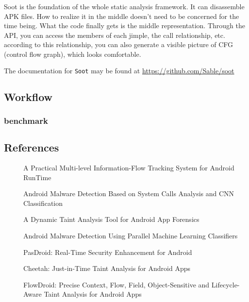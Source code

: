\documentclass{article}
\begin{document}
Soot is the foundation of the whole static analysis framework. It can disassemble APK files. How to realize it in the middle doesn't need to be concerned for the time being. What the code finally gets is the middle representation. Through the API, you can access the members of each jimple, the call relationship, etc. according to this relationship, you can also generate a visible picture of CFG (control flow graph), which looks comfortable.

The documentation for \verb+Soot+ may be found at  \url{https://github.com/Sable/soot}

\subsection{Workflow}
\lipsum[5]
\subsubsection{benchmark}
\lipsum[5]


%   


\subsection{References}
  \begin{description}
    \item[\cite{Sun2016CCS}] A Practical Multi-level Information-Flow Tracking System for Android RunTime
    \item[\cite{ABDE2019WCNCW}] Android Malware Detection Based on System Calls Analysis and CNN Classification
    \item[\cite{Xu2018SPW}] A Dynamic Taint Analysis Tool for Android App Forensics
    \item[\cite{Yerima2014NGMAST}] Android Malware Detection Using Parallel Machine Learning Classifiers
    \item[\cite{Hsiao2014IMIS}] PasDroid: Real-Time Security Enhancement for Android
    \item[\cite{Ngu2017ICSE}] Cheetah: Just-in-Time Taint Analysis for Android Apps
    \item[\cite{Arzt2014SIGPLAN}]  FlowDroid: Precise Context, Flow, Field, Object-Sensitive and Lifecycle-Aware Taint Analysis for Android Apps
  \end{description}
  \label{sec:TaintDroid} 
  
\end{document}
